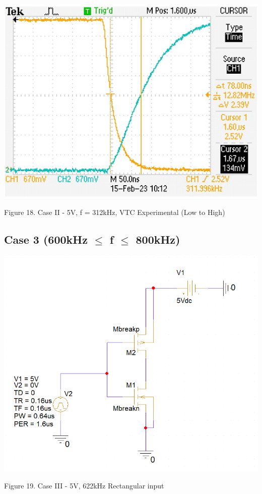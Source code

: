\documentclass[conference]{IEEEtran}
\begin{document}
\begin{center}
    \centerline{\includegraphics[scale = 0.6]{figures/case2_LH_experimental.png}}
    Figure 18. Case II - 5V, f = 312kHz, VTC Experimental (Low to High)
\end{center}

\subsection{Case 3 (600kHz $\leq$ f $\leq$ 800kHz)}

\begin{center}
    \centerline{\includegraphics[scale = 0.43]{figures/case3_circuit.png}}
    Figure 19. Case III - 5V, 622kHz Rectangular input
\end{center}
\end{document}
